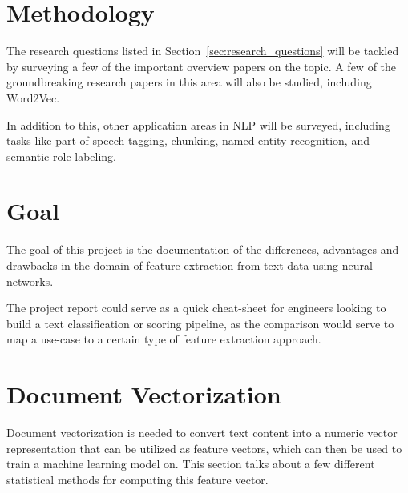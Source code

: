 \documentclass[11pt,a4paper]{article}
\begin{document}

\section{Methodology} %
\label{sec:methodology}

  The research questions listed in Section~\ref{sec:research_questions} will be tackled by surveying a few of the important overview papers on the topic\cite{goldberg2016primer}\cite{bengio2003neural}\cite{morin2005hierarchical}. A few of the groundbreaking research papers in this area will also be studied, including Word2Vec\cite{mikolov2013efficient}\cite{mikolov2013distributed}\cite{mikolov2013linguistic}.

  In addition to this, other application areas in NLP will be surveyed, including tasks like part-of-speech tagging, chunking, named entity recognition, and semantic role labeling. \cite{socher2011parsing}\cite{luong2013better}\cite{maas2015lexicon}\cite{li2015hierarchical}\cite{collobert2011natural}\cite{pennington2014glove}


\section{Goal} %
\label{sec:goal}

  The goal of this project is the documentation of the differences, advantages and drawbacks in the domain of feature extraction from text data using neural networks. 

  The project report could serve as a quick cheat-sheet for engineers looking to build a text classification or scoring pipeline, as the comparison would serve to map a use-case to a certain type of feature extraction approach.



\section{Document Vectorization} %
\label{sec:document_vectorization}

  Document vectorization is needed to convert text content into a numeric vector representation that can be utilized as feature vectors, which can then be used to train a machine learning model on. This section talks about a few different statistical methods for computing this feature vector. \cite{SemEvalPaper}
\end{document}
